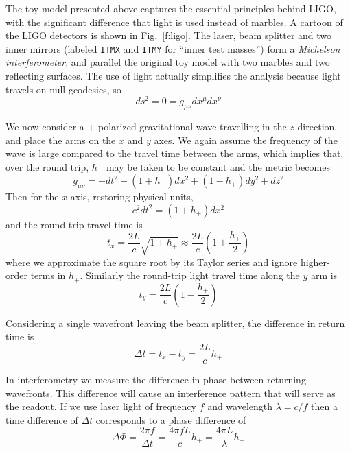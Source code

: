 The toy model presented above captures the essential principles behind
LIGO, with the significant difference that light is used instead of
marbles.  A cartoon of the LIGO detectors is shown in
Fig.~\ref{f:ligo}.  The laser, beam splitter and two inner mirrors
(labeled \texttt{ITMX} and \texttt{ITMY} for ``inner test masses'')
form a \emph{Michelson interferometer}, and parallel the original toy
model with two marbles and two reflecting surfaces.
The use of light actually simplifies the analysis because light
travels on null geodesics, so
%
\begin{equation*}
ds^2 = 0 = g_{\mu\nu} dx^\mu dx^\nu
\end{equation*}

We now consider a +-polarized gravitational wave travelling in the $z$
direction, and place the arms on the $x$ and $y$ axes.  We again
assume the frequency of the wave is large compared to the travel time
between the arms, which implies that, over the round trip, $h_+$ may be
taken to be constant and the metric becomes
%
\begin{equation*}
g_{\mu\nu} = -dt^2 + (1+h_+) dx^2 + (1-h_+) dy^2 + dz^2
\end{equation*}
%
Then for the $x$ axis, restoring physical units,
%
\begin{equation*}
c^2 dt^2 = (1+h_+) dx^2
\end{equation*}
%
and the round-trip travel time is
%
\begin{equation*}
t_x = \frac{2L}{c} \sqrt{1+h_+} \approx \frac{2L}{c} \left(1+\frac{h_+}{2} \right)
\end{equation*}
%
where we approximate the square root by its Taylor series and ignore
higher-order terms in $h_+$.  Similarly the round-trip light travel
time along the $y$ arm is
%
\begin{equation*}
t_y = \frac{2L}{c} \left(1-\frac{h_+}{2} \right)
\end{equation*}

Considering a single wavefront leaving the beam splitter, the
difference in return time is
%
\begin{equation*}
\Delta t = t_x - t_y = \frac{2L}{c} h_+
\end{equation*}

In interferometry we measure the difference in phase between returning
wavefronts.  This difference will cause an interference pattern that
will serve as the readout.  If we use laser light of frequency $f$ and
wavelength $\lambda = c/f$ then a time difference of $\Delta t$
corresponds to a phase difference of 
%
\begin{equation*}
\Delta \Phi = \frac{2\pi f}{\Delta t} = \frac{4\pi f L}{c} h_+
= \frac{4\pi L}{\lambda} h_+
\end{equation*}

